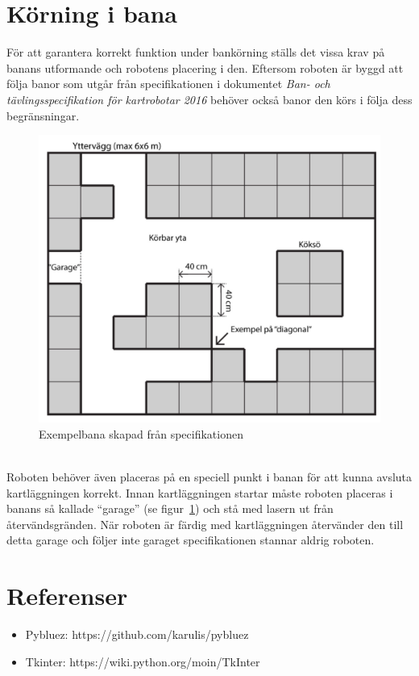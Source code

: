 \documentclass{article}
\begin{document}
\clearpage
\section{Körning i bana}
För att garantera korrekt funktion under bankörning ställs det vissa krav på banans utformande och robotens placering i den. Eftersom roboten är byggd att följa banor som utgår från specifikationen i dokumentet \textit{Ban- och tävlingsspecifikation för kartrobotar 2016} behöver också banor den körs i följa dess begränsningar.
\begin{figure}[H]
\centering
\includegraphics[scale=0.2]{example_map}
\caption{Exempelbana skapad från specifikationen}
\label{fig:example_map}
\end{figure}
\ \\
Roboten behöver även placeras på en speciell punkt i banan för att kunna avsluta kartläggningen korrekt. Innan kartläggningen startar måste roboten placeras i banans så kallade ``garage'' (se figur~\ref{fig:example_map}) och stå med lasern ut från återvändsgränden. När roboten är färdig med kartläggningen återvänder den till detta garage och följer inte garaget specifikationen stannar aldrig roboten.

\clearpage
\section{Referenser}
\begin{itemize}
	\item Pybluez: https://github.com/karulis/pybluez
	\item Tkinter: https://wiki.python.org/moin/TkInter
\end{itemize}

\nocite{*}
{}

\end{document}
